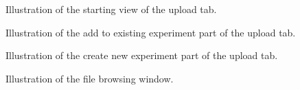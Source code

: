 \begin{figure}[htb]
	\caption{Illustration of the starting view of the upload tab.}
	\label{fig:des_upload-tab}
\end{figure}

\begin{figure}[htb]
	\caption{Illustration of the add to existing experiment part of the upload tab.}
	\label{fig:des_upload-exists}
\end{figure}

\begin{figure}[htb]
	\caption{Illustration of the create new experiment part of the upload tab.}
	\label{fig:des_upload-new}
\end{figure}

\begin{figure}[htb]
	\caption{Illustration of the file browsing window.}
	\label{fig:des_upload}
\end{figure}
\FloatBarrier

